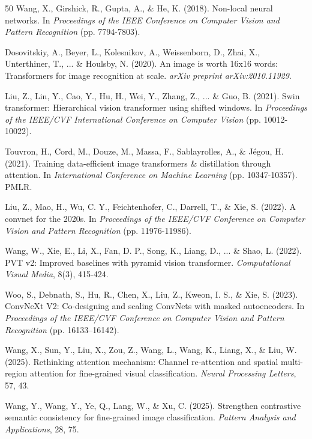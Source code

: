 \documentclass[pdflatex,sn-mathphys-num]{sn-jnl}
\theoremstyle{thmstyleone}%
\theoremstyle{thmstyletwo}%
\theoremstyle{thmstylethree}%
\begin{document}
\begin{thebibliography}{50}
 Wang, X., Girshick, R., Gupta, A., \& He, K. (2018). Non-local neural networks. In \textit{Proceedings of the IEEE Conference on Computer Vision and Pattern Recognition} (pp. 7794-7803).

 Dosovitskiy, A., Beyer, L., Kolesnikov, A., Weissenborn, D., Zhai, X., Unterthiner, T., ... \& Houlsby, N. (2020). An image is worth 16x16 words: Transformers for image recognition at scale. \textit{arXiv preprint arXiv:2010.11929}.

 Liu, Z., Lin, Y., Cao, Y., Hu, H., Wei, Y., Zhang, Z., ... \& Guo, B. (2021). Swin transformer: Hierarchical vision transformer using shifted windows. In \textit{Proceedings of the IEEE/CVF International Conference on Computer Vision} (pp. 10012-10022).

 Touvron, H., Cord, M., Douze, M., Massa, F., Sablayrolles, A., \& Jégou, H. (2021). Training data-efficient image transformers \& distillation through attention. In \textit{International Conference on Machine Learning} (pp. 10347-10357). PMLR.

 Liu, Z., Mao, H., Wu, C. Y., Feichtenhofer, C., Darrell, T., \& Xie, S. (2022). A convnet for the 2020s. In \textit{Proceedings of the IEEE/CVF Conference on Computer Vision and Pattern Recognition} (pp. 11976-11986).

 Wang, W., Xie, E., Li, X., Fan, D. P., Song, K., Liang, D., ... \& Shao, L. (2022). PVT v2: Improved baselines with pyramid vision transformer. \textit{Computational Visual Media}, 8(3), 415-424.

 Woo, S., Debnath, S., Hu, R., Chen, X., Liu, Z., Kweon, I. S., \& Xie, S. (2023). ConvNeXt V2: Co-designing and scaling ConvNets with masked autoencoders. In \textit{Proceedings of the IEEE/CVF Conference on Computer Vision and Pattern Recognition} (pp. 16133--16142).

 Wang, X., Sun, Y., Liu, X., Zou, Z., Wang, L., Wang, K., Liang, X., \& Liu, W. (2025). Rethinking attention mechanism: Channel re-attention and spatial multi-region attention for fine-grained visual classification. \textit{Neural Processing Letters}, 57, 43.

 Wang, Y., Wang, Y., Ye, Q., Lang, W., \& Xu, C. (2025). Strengthen contrastive semantic consistency for fine-grained image classification. \textit{Pattern Analysis and Applications}, 28, 75.


\end{thebibliography}
\end{document}
